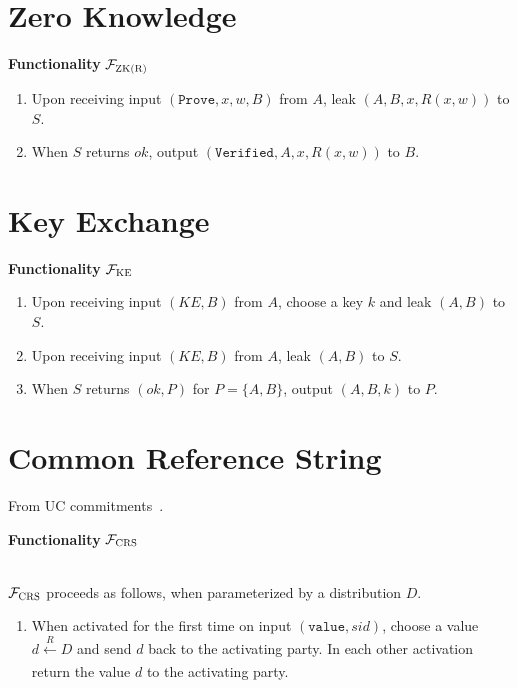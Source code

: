 \documentclass[a4paper]{article}
\newcommand{\F}{\mathcal{F}}
\begin{document}
\section{Zero Knowledge}

\begin{framed}
    \centerline{\textbf{Functionality} $\F_{\textsc{ZK(R)}}$}
    \begin{enumerate}
        \item Upon receiving input $(\texttt{Prove}, x, w, B)$ from $A$, leak $(A, B, x, R(x,w))$ to $S$.
        \item When $S$ returns $ok$, output $(\texttt{Verified}, A, x, R(x,w))$ to $B$.
    \end{enumerate}
\end{framed}



\section{Key Exchange}

\begin{framed}
    \centerline{\textbf{Functionality} $\F_{\textsc{KE}}$}
    \begin{enumerate}
        \item Upon receiving input $(KE, B)$ from $A$, choose a key $k$ and leak $(A,B)$ to $S$.
        \item Upon receiving input $(KE, B)$ from $A$, leak $(A,B)$ to $S$.
        \item When $S$ returns $(ok, P)$ for $P=\{A,B\}$, output $(A,B,k)$ to $P$.
    \end{enumerate}
\end{framed}




\section{Common Reference String}

From UC commitments~\cite{canetti2001universally}.

\begin{framed}
    \centerline{\textbf{Functionality} $\F_{\textsc{CRS}}$}
    \ \\
    \noindent $\F_{\textsc{CRS}}$ proceeds as follows, when parameterized by a distribution $D$.

    \begin{enumerate}
        \item When activated for the first time on input $(\texttt{value}, sid)$, choose a value $d \xleftarrow[]{R} D$ and send $d$ back to the activating party. In each other activation return the value $d$ to the activating party.
    \end{enumerate}
\end{framed}
\end{document}
